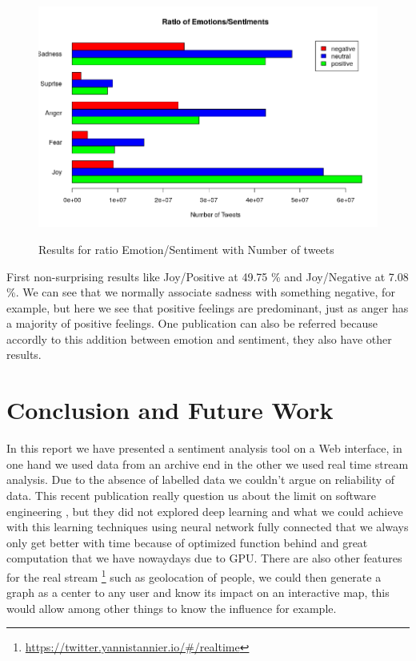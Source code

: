 \documentclass{acmtog} %
\begin{document}
\begin{figure}[h!]
{\includegraphics[width=\linewidth]{final_plot_contradiction_analysis.png}}
\caption{Results for ratio Emotion/Sentiment with Number of tweets}
  \label{fig:contradiction_barplot}
\end{figure}

First non-surprising results like Joy/Positive at 49.75 \% and Joy/Negative at 7.08 \%.
We can see that we normally associate sadness with something negative, for example, but here we see that positive feelings are predominant, just as anger has a majority of positive feelings. One publication can also be referred \cite{Alm05}  because accordly to this addition between emotion and sentiment, they also have other results.


\section{Conclusion and Future Work}
\label{sec:conclusion}

In this report we have presented a sentiment analysis tool on a Web interface, in one hand we used data from an archive end in the other we used real time stream analysis. Due to the absence of labelled data we couldn't argue on reliability of data.  This recent publication really question us about the limit on software engineering \cite{Lin18}, but they did not explored deep learning \cite{Meisheri17} and what we could achieve with this learning techniques using neural network fully connected that we always only get better with time because of optimized function behind and great computation that we have nowaydays due to GPU. 
There are also other features for the real stream \footnote{\url{https://twitter.yannistannier.io/#/realtime}} such as geolocation of people, we could then generate a graph as a center to any user and know its impact on an interactive map, this would allow among other things to know the influence for example.
\end{document}

